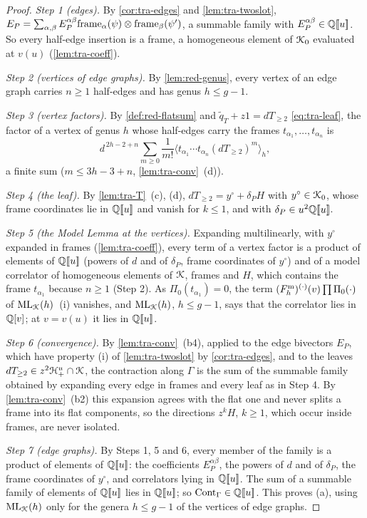 \begin{proof}
\emph{Step 1 (edges).} By \cref{cor:tra-edges} and \cref{lem:tra-twoslot}, $E_P = \sum_{\alpha,\beta}E_P^{\alpha\beta}\mathrm{frame}_\alpha(\psi)\otimes\mathrm{frame}_\beta(\psi')$, a summable family with $E_P^{\alpha\beta}\in\mathbb{Q}[\![ u ]\!]$. So every half-edge insertion is a frame, a homogeneous element of $\mathcal{K}_{0}$ evaluated at $v(u)$ (\cref{lem:tra-coeff}).

\emph{Step 2 (vertices of edge graphs).} By \cref{lem:red-genus}, every vertex of an edge graph carries $n\geq 1$ half-edges and has genus $h\leq g-1$.

\emph{Step 3 (vertex factors).} By \cref{def:red-flatsum} and $\tilde q_T+z1 = dT_{\geq 2}$ \eqref{eq:tra-leaf}, the factor of a vertex of genus $h$ whose half-edges carry the frames $t_{\alpha_1},\dots,t_{\alpha_n}$ is
\[
d^{\,2h-2+n}\sum_{m\geq 0}\frac1{m!}\langle t_{\alpha_1}\cdots t_{\alpha_n}(dT_{\geq 2})^m\rangle_h ,
\]
a finite sum ($m\leq 3h-3+n$, \cref{lem:tra-conv}~(d)).

\emph{Step 4 (the leaf).} By \cref{lem:tra-T}~(c), (d), $dT_{\geq 2} = y^\circ+\delta_PH$ with $y^\circ\in\mathcal{K}_{0}$, whose frame coordinates lie in $\mathbb{Q}[\![ u ]\!]$ and vanish for $k\leq 1$, and with $\delta_P\in u^2\mathbb{Q}[\![ u ]\!]$.

\emph{Step 5 (the Model Lemma at the vertices).} Expanding multilinearly, with $y^\circ$ expanded in frames (\cref{lem:tra-coeff}), every term of a vertex factor is a product of elements of $\mathbb{Q}[\![ u ]\!]$ (powers of $d$ and of $\delta_P$, frame coordinates of $y^\circ$) and of a model correlator of homogeneous elements of $\mathcal{K}$, frames and $H$, which contains the frame $t_{\alpha_1}$ because $n\geq 1$ (Step 2). As $\Pi_0(t_{\alpha_1}) = 0$, the term $(F^{\mathrm{m}}_h)^{(\cdot)}(v)\prod\Pi_0(\cdot)$ of $\mathrm{ML}_{\mathcal{K}}(h)$~(i) vanishes, and $\mathrm{ML}_{\mathcal{K}}(h)$, $h\leq g-1$, says that the correlator lies in $\mathbb{Q}[v]$; at $v = v(u)$ it lies in $\mathbb{Q}[\![ u ]\!]$.

\emph{Step 6 (convergence).} By \cref{lem:tra-conv}~(b4), applied to the edge bivectors $E_P$, which have property (i) of \cref{lem:tra-twoslot} by \cref{cor:tra-edges}, and to the leaves $dT_{\geq 2}\in z^2\mathcal{H}^u_+\cap\mathcal{K}$, the contraction along $\Gamma$ is the sum of the summable family obtained by expanding every edge in frames and every leaf as in Step 4. By \cref{lem:tra-conv}~(b2) this expansion agrees with the flat one and never splits a frame into its flat components, so the directions $z^kH$, $k\geq 1$, which occur inside frames, are never isolated.

\emph{Step 7 (edge graphs).} By Steps 1, 5 and 6, every member of the family is a product of elements of $\mathbb{Q}[\![ u ]\!]$: the coefficients $E_P^{\alpha\beta}$, the powers of $d$ and of $\delta_P$, the frame coordinates of $y^\circ$, and correlators lying in $\mathbb{Q}[\![ u ]\!]$. The sum of a summable family of elements of $\mathbb{Q}[\![ u ]\!]$ lies in $\mathbb{Q}[\![ u ]\!]$; so $\mathrm{Cont}_\Gamma\in\mathbb{Q}[\![ u ]\!]$. This proves (a), using $\mathrm{ML}_{\mathcal{K}}(h)$ only for the genera $h\leq g-1$ of the vertices of edge graphs.


\end{proof}
